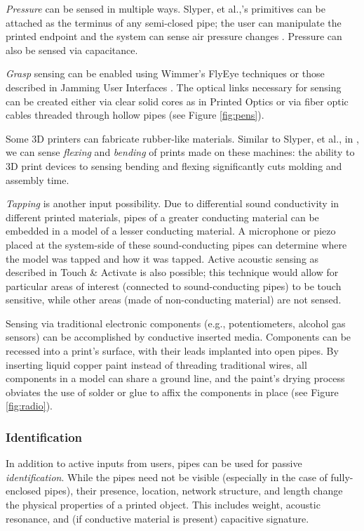 \emph{Pressure} can be sensed in multiple ways.  Slyper, et al.,'s primitives can be attached as the terminus of any semi-closed pipe; the user can manipulate the printed endpoint and the system can sense air pressure changes \cite{Slyper-pressure}.  Pressure can also be sensed via capacitance.

\emph{Grasp} sensing can be enabled using Wimmer's FlyEye techniques \cite{Wimmer-flyeye} or those described in Jamming User Interfaces \cite{Follmer-jamming}.  The optical links necessary for sensing can be created either via clear solid cores as in Printed Optics \cite{Willis-printedoptics} or via fiber optic cables threaded through hollow pipes (see Figure \ref{fig:pens}).

Some 3D printers can fabricate rubber-like materials.  Similar to Slyper, et al., in \cite{Slyper-shape}, we can sense \emph{flexing} and \emph{bending} of prints made on these machines: the ability to 3D print devices to sensing bending and flexing significantly cuts molding and assembly time.

\emph{Tapping} is another input possibility.  Due to differential sound conductivity in different printed materials, pipes of a greater conducting material can be embedded in a model of a lesser conducting material.  A microphone or piezo placed at the system-side of these sound-conducting pipes can determine where the model was tapped and how it was tapped.  Active acoustic sensing as described in Touch \& Activate \cite{Ono-touchandactivate} is also possible; this technique would allow for particular areas of interest (connected to sound-conducting pipes) to be touch sensitive, while other areas (made of non-conducting material) are not sensed.

Sensing via traditional electronic components (e.g., potentiometers, alcohol gas sensors) can be accomplished by conductive inserted media.  Components can be recessed into a print's surface, with their leads implanted into open pipes.  By inserting liquid copper paint instead of threading traditional wires, all components in a model can share a ground line, and the paint's drying process obviates the use of solder or glue to affix the components in place (see Figure \ref{fig:radio}).

\subsubsection{Identification}
In addition to active inputs from users, pipes can be used for passive \emph{identification}.  While the pipes need not be visible (especially in the case of fully-enclosed pipes), their presence, location, network structure, and length change the physical properties of a printed object.  This includes weight, acoustic resonance, and (if conductive material is present) capacitive signature.

